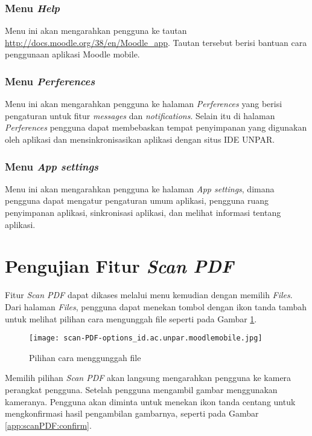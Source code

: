 \subsubsection{Menu \textit{Help}}
Menu ini akan mengarahkan pengguna ke tautan \url{http://docs.moodle.org/38/en/Moodle\_app}. Tautan tersebut berisi bantuan cara penggunaan aplikasi Moodle mobile.

\subsubsection{Menu \textit{Perferences}}
Menu ini akan mengarahkan pengguna ke halaman \textit{Perferences} yang berisi pengaturan untuk fitur \textit{messages} dan \textit{notifications}. Selain itu di halaman \textit{Perferences} pengguna dapat membebaskan tempat penyimpanan yang digunakan oleh aplikasi dan mensinkronisasikan aplikasi dengan situs IDE UNPAR.

\subsubsection{Menu \textit{App settings}}
Menu ini akan mengarahkan pengguna ke halaman \textit{App settings}, dimana pengguna dapat mengatur pengaturan umum aplikasi, pengguna ruang penyimpanan aplikasi, sinkronisasi aplikasi, dan melihat informasi tentang aplikasi.

\section{Pengujian Fitur \textit{Scan PDF}}

Fitur \textit{Scan PDF} dapat dikases melalui menu kemudian dengan memilih \textit{Files}. Dari halaman \textit{Files}, pengguna dapat menekan tombol dengan ikon tanda tambah untuk melihat pilihan cara mengunggah file seperti pada Gambar \ref{app:menu:files:options}. 

\begin{figure}[H] 
	\centering  
	\texttt{[image: scan-PDF-options\_id.ac.unpar.moodlemobile.jpg]}  
	\caption[Pilihan cara menggunggah file] {Pilihan cara menggunggah file} 
	\label{app:menu:files:options} 
\end{figure}  

Memilih pilihan \textit{Scan PDF} akan langsung mengarahkan pengguna ke kamera perangkat pengguna. Setelah pengguna mengambil gambar menggunakan kameranya. Pengguna akan diminta untuk menekan ikon tanda centang untuk mengkonfirmasi hasil pengambilan gambarnya, seperti pada Gambar \ref{app:scanPDF:confirm}.

